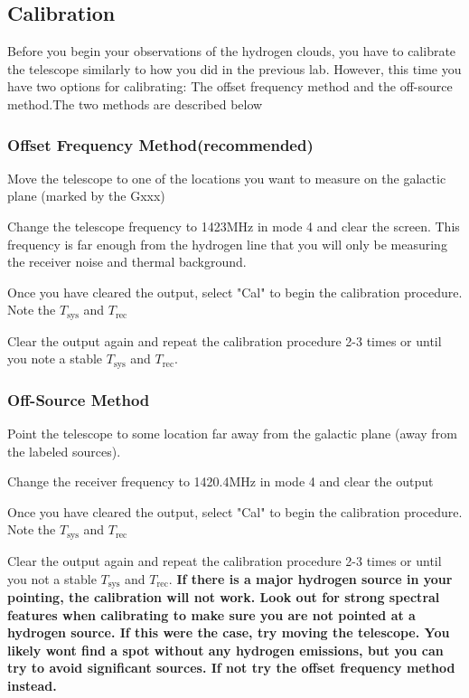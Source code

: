 \subsection{Calibration}
Before you begin your observations of the hydrogen clouds, you have to calibrate the telescope similarly to how you did in the previous lab. However, this time you have two options for calibrating: The offset frequency method and the off-source method.The two methods are described below

\subsubsection{Offset Frequency Method(recommended)}
\begin{steps}
	\item Move the telescope to one of the locations you want to measure on the galactic plane (marked by the Gxxx)
	
	\item Change the telescope frequency to 1423MHz in mode 4 and clear the screen. This frequency is far enough from the hydrogen line that you will only be measuring the receiver noise and thermal background.
	
	\item Once you have cleared the output, select "Cal" to begin the calibration procedure. Note the $T_\textrm{sys}$ and $T_\textrm{rec}$
	
	\item Clear the output again and repeat the calibration procedure 2-3 times or until you note a stable $T_\textrm{sys}$ and $T_\textrm{rec}$. 
\end{steps}

\subsubsection{Off-Source Method}

\begin{steps}
	\item Point the telescope to some location far away from the galactic plane (away from the labeled sources). 
	
	\item Change the receiver frequency to 1420.4MHz in mode 4 and clear the output
	
	\item Once you have cleared the output, select "Cal" to begin the calibration procedure. Note the $T_\textrm{sys}$ and $T_\textrm{rec}$
	
	\item  Clear the output again and repeat the calibration procedure 2-3 times or until you not a stable $T_\textrm{sys}$ and $T_\textrm{rec}$. \textbf{If there is a major hydrogen source in your pointing, the calibration will not work. Look out for strong spectral features when calibrating to make sure you are not pointed at a hydrogen source. If this were the case, try moving the telescope. You likely wont find a spot without any hydrogen emissions, but you can try to avoid significant sources. If not try the offset frequency method instead.} 
\end{steps}


